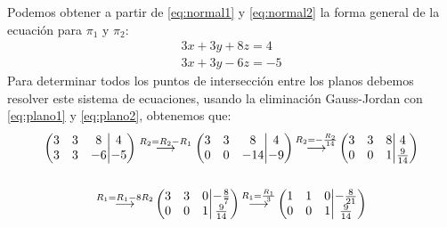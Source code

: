 \documentclass[12pt,titlepage]{article}
\begin{document}
\begin{enumerate}
\begin{equation}
\end{equation}
Podemos obtener a partir de \eqref{eq:normal1} y \eqref{eq:normal2} la forma general de la ecuación para $\pi_{1}$ y $\pi_{2}$:
\begin{gather}
3x+3y+8z=4\label{eq:plano1}\\
3x+3y-6z=-5\label{eq:plano2}
\end{gather}
Para determinar todos los puntos de intersección entre los planos debemos resolver este sistema de ecuaciones, usando la eliminación Gauss-Jordan con \eqref{eq:plano1} y \eqref{eq:plano2}, obtenemos que:
\begin{gather}
\left(\begin{matrix}3&3&8\\3&3&-6\\\end{matrix}\middle|\begin{matrix}4\\-5\\\end{matrix}\right)\buildrel R_2=R_2-R_1\over\longrightarrow\left(\begin{matrix}3&3&8\\0&0&-14\\\end{matrix}\middle|\begin{matrix}4\\-9\\\end{matrix}\right){\buildrel R_2=-\frac{R_2}{14}\over\longrightarrow}\left(\begin{matrix}3&3&8\\0&0&1\\\end{matrix}\middle|\begin{matrix}4\\\frac{9}{14}\\\end{matrix}\right)\nonumber\\\nonumber\\
{\buildrel R_1=R_1-8R_2\over\longrightarrow}\left(\begin{matrix}3&3&0\\0&0&1\\\end{matrix}\middle|\begin{matrix}-\frac{8}{7}\\\frac{9}{14}\\\end{matrix}\right){\buildrel R_1=\frac{R_1}{3}\over\longrightarrow}\left(\begin{matrix}1&1&0\\0&0&1\\\end{matrix}\middle|\begin{matrix}-\frac{8}{21}\\\frac{9}{14}\\\end{matrix}\right)\label{eq:puntosint}

\end{gather}
\end{enumerate}
\end{document}
